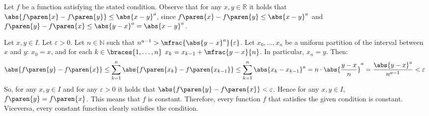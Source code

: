 Let $f$ be a function satisfying the stated condition.
Observe that for any $x, y \in \mathbb{R}$ it holds that
$\abs{f\paren{x} - f\paren{y}} \leq \abs{x - y}^{a}$,
since $f\paren{x} - f\paren{y} \leq \abs{x - y}^{a}$
and $f\paren{y} - f\paren{x} \leq \abs{y - x}^{a} = \abs{x - y}^{a}$.

Let $x, y \in I$.
Let $\varepsilon > 0$.
Let $n \in \mathbb{N}$ such that
$n^{a - 1} > \mfrac{\abs{y - x}^{a}}{\varepsilon}$.
Let $x_0, \dotsc, x_n$ be a uniform partition
of the interval between $x$ and $y$:
$x_0 = x$, and for each $k \in \braces{1, \dotsc, n}$
$x_k = x_{k-1} + \mfrac{y - x}{n}$.
In particular, $x_n = y$.
Then:
\begin{equation*}
  \abs{f\paren{y} - f\paren{x}}
  \leq \sum\limits_{k = 1}^{n} {\abs{f\paren{x_k} - f\paren{x_{k-1}}}}
  \leq \sum\limits_{k = 1}^{n} {\abs{x_k - x_{k-1}}^{a}}
  = n \cdot \abs{\frac{y - x}{n}}^{a}
  = \frac{\abs{y - x}^a}{n^{a-1}}
  < \varepsilon
\end{equation*}
So, for any $x, y \in I$ and for any $\varepsilon > 0$
it holds that $\abs{f\paren{y} - f\paren{x}} < \varepsilon$.
Hence for any $x, y \in I$, $f\paren{y} = f\paren{x}$.
This means that $f$ is constant.
Therefore, every function $f$ that satisfies the given condition is constant.
Viceversa, every constant function clearly satisfies the condition.
